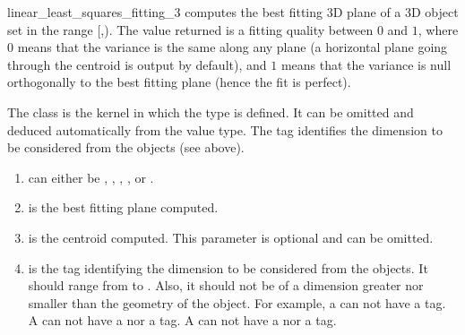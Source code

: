 \begin{ccRefFunction}{linear_least_squares_fitting_3}
{ computes the best fitting 3D plane of a 3D object set in the range
[,). The value returned is a fitting quality
between $0$ and $1$, where $0$ means that the variance is the same
along any plane (a horizontal plane going through the centroid is output
by default), and $1$ means that the variance is null orthogonally
to the best fitting plane (hence the fit is perfect). }

The class  is the kernel in which the type  is defined. It can be omitted and deduced automatically from the value type. The tag  identifies the dimension to be considered from the objects (see above).


\begin{enumerate}
   \item  {} can either be ,
          , , ,
           or .
   \item  {} is the best fitting plane computed.
   \item  {} is the centroid computed. This parameter is optional and can be omitted.
   \item  {} is the tag identifying the dimension to be considered from the objects. It should range from  to . Also, it should not be of a dimension greater nor smaller than the geometry of the object. For example, a  can not have a  tag. A  can not have a  nor a  tag. A  can not have a  nor a  tag.
\end{enumerate}

\end{ccRefFunction}
